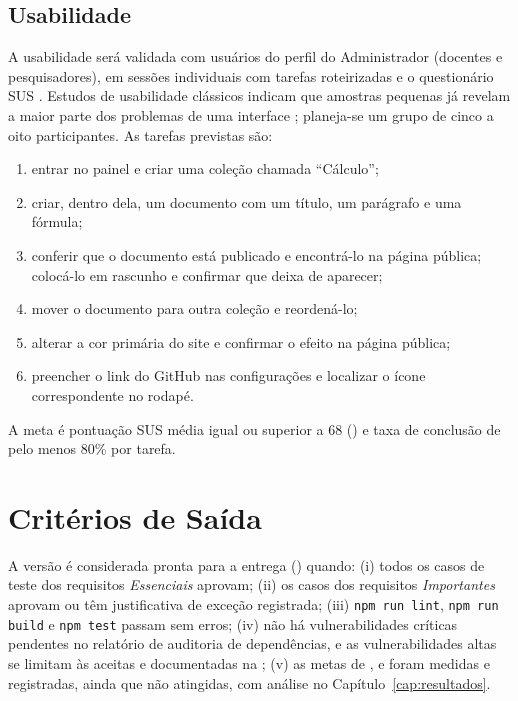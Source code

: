 
\subsection{Usabilidade}

A usabilidade será validada com usuários do perfil do Administrador (docentes e pesquisadores), em sessões individuais com tarefas roteirizadas e o questionário SUS \cite{brooke1996sus}. Estudos de usabilidade clássicos indicam que amostras pequenas já revelam a maior parte dos problemas de uma interface \cite{nielsen1993usability}; planeja-se um grupo de cinco a oito participantes. As tarefas previstas são:

\begin{enumerate}[label=\textbf{T\arabic*.}, leftmargin=1.2cm]
  \item entrar no painel e criar uma coleção chamada ``Cálculo'';
  \item criar, dentro dela, um documento com um título, um parágrafo e uma fórmula;
  \item conferir que o documento está publicado e encontrá-lo na página pública; colocá-lo em rascunho e confirmar que deixa de aparecer;
  \item mover o documento para outra coleção e reordená-lo;
  \item alterar a cor primária do site e confirmar o efeito na página pública;
  \item preencher o link do GitHub nas configurações e localizar o ícone correspondente no rodapé.
\end{enumerate}

A meta é pontuação SUS média igual ou superior a 68 () e taxa de conclusão de pelo menos 80\% por tarefa.


\section{Critérios de Saída}\label{sec:testes-saida}

A versão é considerada pronta para a entrega () quando: (i) todos os casos de teste dos requisitos \emph{Essenciais} aprovam; (ii) os casos dos requisitos \emph{Importantes} aprovam ou têm justificativa de exceção registrada; (iii) \texttt{npm run lint}, \texttt{npm run build} e \texttt{npm test} passam sem erros; (iv) não há vulnerabilidades críticas pendentes no relatório de auditoria de dependências, e as vulnerabilidades altas se limitam às aceitas e documentadas na ; (v) as metas de ,  e  foram medidas e registradas, ainda que não atingidas, com análise no Capítulo~\ref{cap:resultados}.

